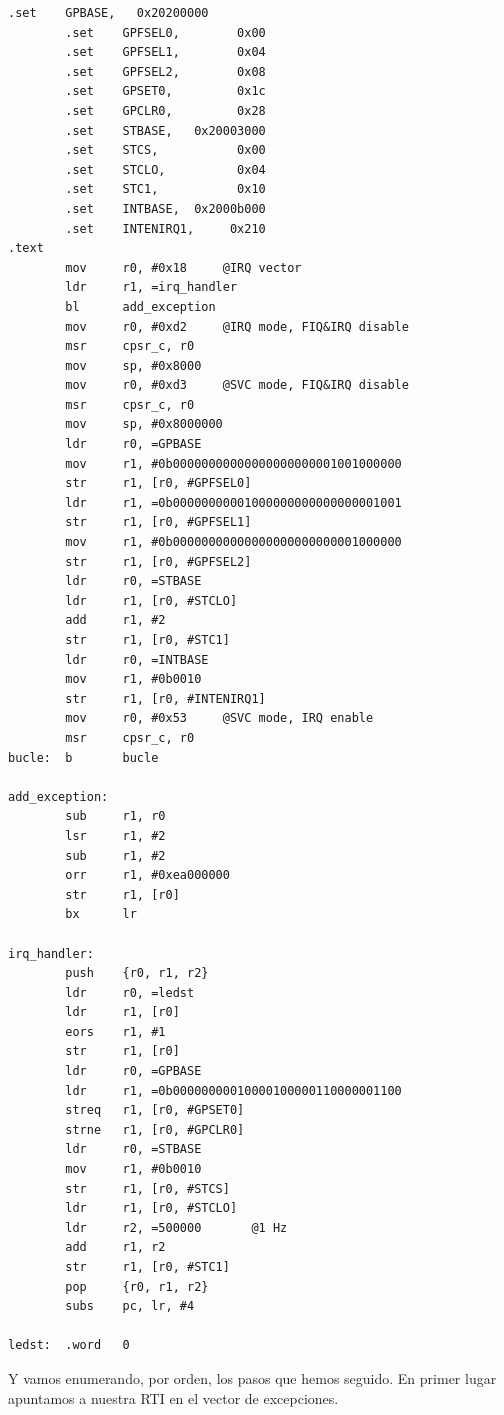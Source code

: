 \begin{lstlisting}[caption={inter1.c},label={lst:codigoPract5_1}]
        .set    GPBASE,   0x20200000
        .set    GPFSEL0,        0x00
        .set    GPFSEL1,        0x04
        .set    GPFSEL2,        0x08
        .set    GPSET0,         0x1c
        .set    GPCLR0,         0x28
        .set    STBASE,   0x20003000
        .set    STCS,           0x00
        .set    STCLO,          0x04
        .set    STC1,           0x10
        .set    INTBASE,  0x2000b000
        .set    INTENIRQ1,     0x210
.text
        mov     r0, #0x18     @IRQ vector
        ldr     r1, =irq_handler
        bl      add_exception
        mov     r0, #0xd2     @IRQ mode, FIQ&IRQ disable
        msr     cpsr_c, r0
        mov     sp, #0x8000
        mov     r0, #0xd3     @SVC mode, FIQ&IRQ disable
        msr     cpsr_c, r0
        mov     sp, #0x8000000
        ldr     r0, =GPBASE
        mov     r1, #0b00000000000000000000001001000000
        str     r1, [r0, #GPFSEL0]
        ldr     r1, =0b00000000001000000000000000001001
        str     r1, [r0, #GPFSEL1]
        mov     r1, #0b00000000000000000000000001000000
        str     r1, [r0, #GPFSEL2]
        ldr     r0, =STBASE
        ldr     r1, [r0, #STCLO]
        add     r1, #2
        str     r1, [r0, #STC1]
        ldr     r0, =INTBASE
        mov     r1, #0b0010
        str     r1, [r0, #INTENIRQ1]
        mov     r0, #0x53     @SVC mode, IRQ enable
        msr     cpsr_c, r0
bucle:  b       bucle

add_exception:
        sub     r1, r0
        lsr     r1, #2
        sub     r1, #2
        orr     r1, #0xea000000
        str     r1, [r0]
        bx      lr

irq_handler:
        push    {r0, r1, r2}
        ldr     r0, =ledst
        ldr     r1, [r0]
        eors    r1, #1
        str     r1, [r0]
        ldr     r0, =GPBASE
        ldr     r1, =0b00000000010000100000110000001100
        streq   r1, [r0, #GPSET0]
        strne   r1, [r0, #GPCLR0]
        ldr     r0, =STBASE
        mov     r1, #0b0010
        str     r1, [r0, #STCS]
        ldr     r1, [r0, #STCLO]
        ldr     r2, =500000       @1 Hz
        add     r1, r2
        str     r1, [r0, #STC1]
        pop     {r0, r1, r2}
        subs    pc, lr, #4

ledst:  .word   0
\end{lstlisting}

Y vamos enumerando, por orden, los pasos que hemos seguido. En primer lugar apuntamos a nuestra
RTI en el vector de excepciones.

